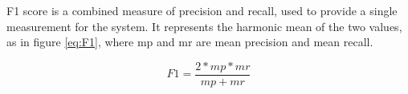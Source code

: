 \documentclass[12pt]{article}
\begin{document}
	F1 score is a combined measure of precision and recall, used to provide a single measurement for the system. It represents the harmonic mean of the two values, as in figure \ref{eq:F1}, where mp and mr are mean precision and mean recall.
	
	\begin{equation}
	\label{eq:F1}
	F1 = \frac{2 * mp * mr}{mp + mr}
	\end{equation}
	
	\newpage
	
	
\end{document}

